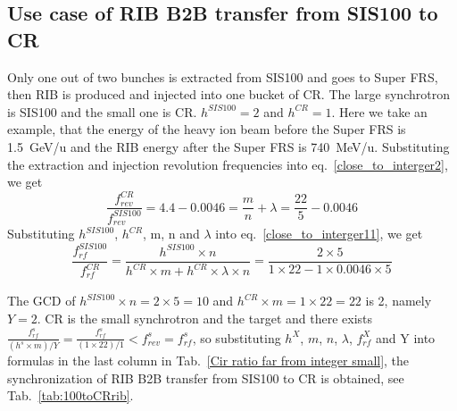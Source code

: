 \subsection{Use case of RIB B2B transfer from SIS100 to CR} 
Only one out of two bunches is extracted from SIS100 and goes to Super FRS, then RIB is produced and injected into one bucket of CR. The large synchrotron is SIS100 and the small one is CR. $h^{\mathit{SIS100}}=2$ and $h^{\mathit{CR}}=1$. Here we take an example, that the energy of the heavy ion beam before the Super FRS is \SI{1.5}{GeV/\atomicmassunit} and the RIB energy after the Super FRS is \SI{740}{MeV/\atomicmassunit}. Substituting the extraction and injection revolution frequencies into eq.~\ref{close_to_interger2}, we get
\begin{equation} 
\frac{f_{\mathit{rev}}^{\mathit{CR}}}{f_{\mathit{rev}}^{\mathit{SIS100}}}=4.4-0.0046=\frac{m}{n}+ \lambda=\frac{22}{5}-0.0046
\end{equation}
Substituting $h^{\mathit{SIS100}}$, $h^{\mathit{CR}}$, m, n and $\lambda$ into eq.~\ref{close_to_interger11}, we get
\begin{equation} 
\frac{f_{\mathit{rf}}^{\mathit{SIS100}}}{f_{\mathit{rf}}^{\mathit{CR}}}=\frac{h^{\mathit{SIS100}}\times n}{h^{\mathit{CR}} \times m+ h^{\mathit{CR}} \times\lambda\times n}=\frac{2\times 5}{1 \times 22- 1 \times0.0046\times 5}
\end{equation}

The GCD of $h^{\mathit{SIS100}}\times n=2\times5=10$ and $h^{\mathit{CR}} \times m=1\times 22=22$ is 2, namely $Y=2$. CR is the small synchrotron and the target and there exists $\frac{f_{\mathit{rf}}^{s}}{(h^s\times m)/Y}=\frac{f_{\mathit{rf}}^{s}}{(1\times 22)/1}<f_{\mathit{rev}}^{s}=f_{\mathit{rf}}^{s}$, so substituting $h^X$, $m$, $n$, $\lambda$, $f_{\mathit{rf}}^{X}$ and Y into formulas in the last column in Tab.~\ref{Cir ratio far from integer small}, the synchronization of RIB B2B transfer from SIS100 to CR is obtained, see Tab.~\ref{tab:100toCRrib}.

